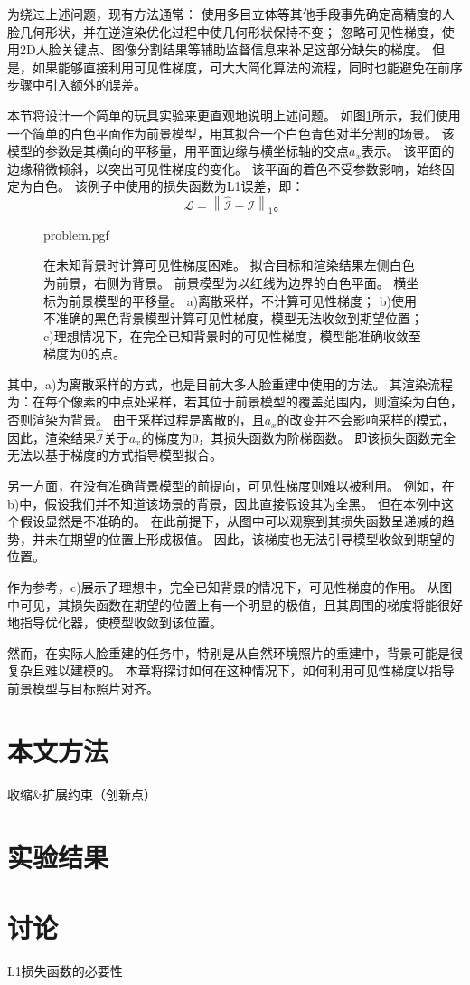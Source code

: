 为绕过上述问题，现有方法通常：
使用多目立体等其他手段事先确定高精度的人脸几何形状，并在逆渲染优化过程中使几何形状保持不变\citep{RiviereGBGB20}；
忽略可见性梯度，使用2D人脸关键点\citep{deep3d}、图像分割\citep{nvdiffrec}结果等辅助监督信息来补足这部分缺失的梯度。
但是，如果能够直接利用可见性梯度，可大大简化算法的流程，同时也能避免在前序步骤中引入额外的误差。

本节将设计一个简单的玩具实验来更直观地说明上述问题。
如图\ref{fig:problem}所示，我们使用一个简单的白色平面作为前景模型，用其拟合一个白色青色对半分割的场景。
该模型的参数是其横向的平移量，用平面边缘与横坐标轴的交点$a_x$表示。
该平面的边缘稍微倾斜，以突出可见性梯度的变化。
该平面的着色不受参数影响，始终固定为白色。
该例子中使用的损失函数为L1误差，即：
\begin{equation}
\mathcal{L} = \left\| \hat{\mathcal{I}} - \mathcal{I} \right\|_1
\text{。}
\end{equation}

\begin{figure}
\centering
{problem.pgf}
\caption[在未知背景时计算可见性梯度困难]{
    在未知背景时计算可见性梯度困难。
    拟合目标和渲染结果左侧白色为前景，右侧为背景。
    前景模型为以红线为边界的白色平面。
    横坐标为前景模型的平移量。
    a)离散采样，不计算可见性梯度；
    b)使用不准确的黑色背景模型计算可见性梯度，模型无法收敛到期望位置；
    c)理想情况下，在完全已知背景时的可见性梯度，模型能准确收敛至梯度为0的点。
}
\label{fig:problem}
\end{figure}

其中，a)为离散采样的方式，也是目前大多人脸重建中使用的方法。
其渲染流程为：在每个像素的中点处采样，若其位于前景模型的覆盖范围内，则渲染为白色，否则渲染为背景。
由于采样过程是离散的，且$a_x$的改变并不会影响采样的模式，因此，渲染结果$\hat{\mathcal{I}}$关于$a_x$的梯度为0，其损失函数为阶梯函数。
即该损失函数完全无法以基于梯度的方式指导模型拟合。

另一方面，在没有准确背景模型的前提向，可见性梯度则难以被利用。
例如，在b)中，假设我们并不知道该场景的背景，因此直接假设其为全黑。
但在本例中这个假设显然是不准确的。
在此前提下，从图中可以观察到其损失函数呈递减的趋势，并未在期望的位置上形成极值。
因此，该梯度也无法引导模型收敛到期望的位置。

作为参考，c)展示了理想中，完全已知背景的情况下，可见性梯度的作用。
从图中可见，其损失函数在期望的位置上有一个明显的极值，且其周围的梯度将能很好地指导优化器，使模型收敛到该位置。

然而，在实际人脸重建的任务中，特别是从自然环境照片的重建中，背景可能是很复杂且难以建模的。
本章将探讨如何在这种情况下，如何利用可见性梯度以指导前景模型与目标照片对齐。

\section{本文方法}

收缩\&扩展约束（创新点）

\section{实验结果}

\section{讨论}

L1损失函数的必要性
